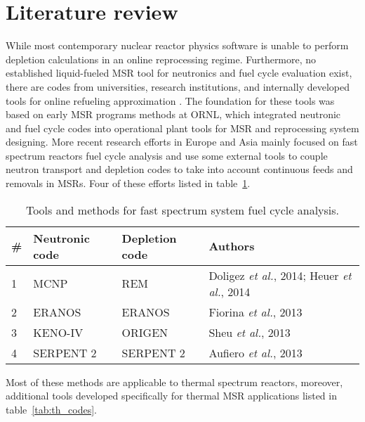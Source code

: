\section{Literature review}
While most contemporary nuclear reactor physics software is unable to perform depletion calculations in an online reprocessing regime. Furthermore, no established liquid-fueled \gls{MSR} tool for neutronics and fuel cycle evaluation exist, there are codes from universities, research institutions, and internally developed tools for online refueling approximation \cite{serp_molten_2014}. The foundation for these tools was based on early \gls{MSR} programs  methods at \gls{ORNL}, which integrated neutronic and fuel cycle codes \cite{bauman_rod:_1971} into operational plant tools \cite{kee_mrpp:_1976} for \gls{MSR} and reprocessing system designing. More recent research efforts in Europe and Asia mainly focused on fast spectrum reactors fuel cycle analysis and use some external tools to couple neutron transport and depletion codes to take into account continuous feeds and removals in \glspl{MSR}. Four of these efforts listed in table~\ref{tab:fs_codes}.

\begin{table}[h!]
\centering
\caption{Tools and methods for fast spectrum system fuel cycle analysis.}
\begin{tabular}{ |m{}|m{}|m{}|m{}|} 
\hline
\# & Neutronic code  & Depletion code    & Authors         \\[5pt]
\hline
1 & \gls{MCNP} \cite{noauthor_mcnp_2004}      & REM \cite{heuer_simulation_2010}  & Doligez \emph{et al.}, 2014; Heuer \emph{et al.}, 2014 \cite{doligez_coupled_2014,heuer_towards_2014}    \\[5pt]
\hline
2 & ERANOS \cite{ruggieri_eranos_2006}      & ERANOS     & Fiorina \emph{et al.}, 2013 \cite{fiorina_investigation_2013}\\[5pt]
\hline
3 & KENO-IV \cite{goluoglu_monte_2011}     & ORIGEN \cite{gauld_isotopic_2011}     & Sheu \emph{et al.}, 2013 \cite{sheu_depletion_2013} \\[5pt]
\hline
4 & SERPENT 2 \cite{leppanen_serpent_2015}   & SERPENT 2  & Aufiero \emph{et al.}, 2013 \cite{aufiero_extended_2013} \\[5pt]
\hline
\end{tabular}
  \label{tab:fs_codes}
\end{table}

Most of these methods are applicable to thermal spectrum reactors, moreover, additional tools developed specifically for thermal \gls{MSR} applications listed in table~\ref{tab:th_codes}.

